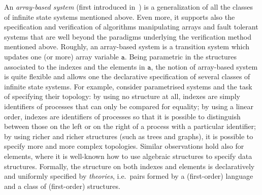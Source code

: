 \documentclass{LMCS}
\theoremstyle{plain}\newtheorem{assumption}[thm]{Assumption}
\theoremstyle{plain}\newtheorem{proposition}[thm]{Proposition}
\theoremstyle{plain}\newtheorem{property}[thm]{Property}
\theoremstyle{plain}\newtheorem{example}[thm]{Example}
\theoremstyle{plain}\newtheorem{claim}[thm]{Claim}
\theoremstyle{plain}\newtheorem{lemma}[thm]{Lemma}
\begin{document}
An \emph{array-based system} (first introduced in~\cite{ijcar08}) is a
generalization of all the classes of infinite state systems mentioned
above.  Even more, it supports also the specification and verification
of algorithms manipulating arrays and fault tolerant systems that are
well beyond the paradigms underlying the verification method mentioned
above.  Roughly, an array-based system is a transition system which
updates one (or more) array variable $\mathtt{a}$.  Being parametric
in the structures associated to the indexes and the elements in
$\mathtt{a}$, the notion of array-based system is quite flexible and
allows one the declarative specification of several classes of
infinite state systems.  For example, consider parametrised systems
and the task of specifying their topology: by using no structure at
all, indexes are simply identifiers of processes that can only be
compared for equality; by using a linear order, indexes are
identifiers of processes so that it is possible to distinguish between
those on the left or on the right of a process with a particular
identifier; by using richer and richer structures (such as trees and
graphs), it is possible to specify more and more complex
topologies. Similar observations hold also for elements, where it is
well-known how to use algebraic structures to specify data structures.
Formally, the structure on both indexes and elements is declaratively
and uniformly specified by \emph{theories}, i.e.\ pairs formed by a
(first-order) language and a class of (first-order) structures.
\end{document}
